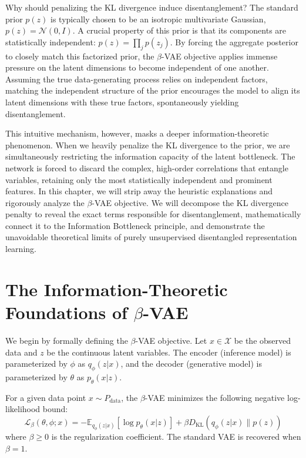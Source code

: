 Why should penalizing the KL divergence induce disentanglement? The standard prior $p(z)$ is typically chosen to be an isotropic multivariate Gaussian, $p(z) = \mathcal{N}(0, I)$. A crucial property of this prior is that its components are statistically independent: $p(z) = \prod_{j} p(z_j)$. By forcing the aggregate posterior to closely match this factorized prior, the $\beta$-VAE objective applies immense pressure on the latent dimensions to become independent of one another. Assuming the true data-generating process relies on independent factors, matching the independent structure of the prior encourages the model to align its latent dimensions with these true factors, spontaneously yielding disentanglement.

This intuitive mechanism, however, masks a deeper information-theoretic phenomenon. When we heavily penalize the KL divergence to the prior, we are simultaneously restricting the information capacity of the latent bottleneck. The network is forced to discard the complex, high-order correlations that entangle variables, retaining only the most statistically independent and prominent features. In this chapter, we will strip away the heuristic explanations and rigorously analyze the $\beta$-VAE objective. We will decompose the KL divergence penalty to reveal the exact terms responsible for disentanglement, mathematically connect it to the Information Bottleneck principle, and demonstrate the unavoidable theoretical limits of purely unsupervised disentangled representation learning.

\section{The Information-Theoretic Foundations of $\beta$-VAE}

We begin by formally defining the $\beta$-VAE objective. Let $x \in \mathcal{X}$ be the observed data and $z$ be the continuous latent variables. The encoder (inference model) is parameterized by $\phi$ as $q_\phi(z|x)$, and the decoder (generative model) is parameterized by $\theta$ as $p_\theta(x|z)$.

\begin{definition}
For a given data point $x \sim P_{\text{data}}$, the $\beta$-VAE minimizes the following negative log-likelihood bound:
\begin{equation}
    \mathcal{L}_\beta(\theta, \phi; x) = -\mathbb{E}_{q_\phi(z|x)}[\log p_\theta(x|z)] + \beta D_{\text{KL}}(q_\phi(z|x) \parallel p(z))
\end{equation}
where $\beta \geq 0$ is the regularization coefficient. The standard VAE is recovered when $\beta = 1$.
\end{definition}

